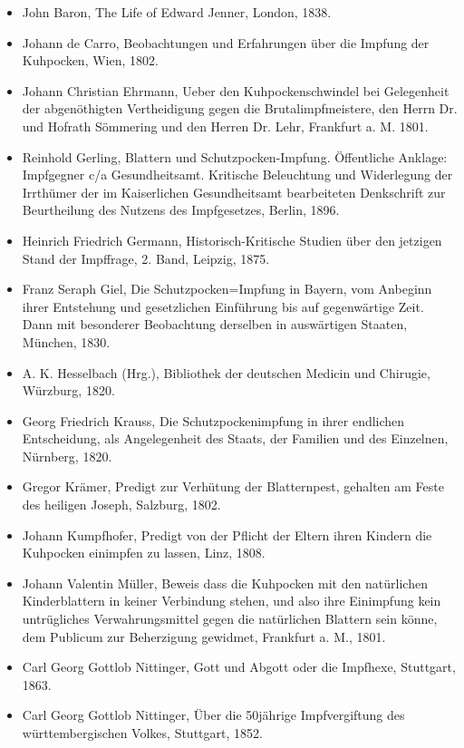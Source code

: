 \documentclass[
    a4paper,
    12pt,
    hyphens,
    chapterprefix=true,
    headheight=33pt,
    footheight=29pt,
    headings=optiontohead,
]{scrartcl}
\begin{document}
{\begin{itemize}
\item{John Baron, The Life of Edward Jenner, London, 1838.}
\item{Johann de Carro, Beobachtungen und Erfahrungen über die Impfung der Kuhpocken, Wien, 1802.}
\item{Johann Christian Ehrmann, Ueber den Kuhpockenschwindel bei Gelegenheit der abgenöthigten Vertheidigung gegen die Brutalimpfmeistere, den Herrn Dr. und Hofrath Sömmering und den Herren Dr. Lehr, Frankfurt a. M. 1801.}
\item{Reinhold Gerling, Blattern und Schutzpocken-Impfung. Öffentliche Anklage: Impfgegner c/a Gesundheitsamt. Kritische  Beleuchtung  und  Widerlegung  der  Irrthümer der  im  Kaiserlichen  Gesundheitsamt  bearbeiteten  Denkschrift  zur Beurtheilung  des  Nutzens  des  Impfgesetzes, Berlin, 1896.}
\item{Heinrich Friedrich Germann, Historisch-Kritische Studien über den jetzigen Stand der Impffrage, 2. Band, Leipzig, 1875.}
\item{Franz Seraph Giel, Die Schutzpocken=Impfung in Bayern, vom Anbeginn ihrer Entstehung und gesetzlichen Einführung  bis auf gegenwärtige Zeit. Dann mit besonderer Beobachtung derselben in auswärtigen Staaten, München, 1830.}
\item{A. K. Hesselbach (Hrg.), Bibliothek der deutschen Medicin und Chirugie, Würzburg, 1820.}
\item{Georg Friedrich Krauss, Die Schutzpockenimpfung in ihrer endlichen Entscheidung, als Angelegenheit des Staats, der Familien und des Einzelnen, Nürnberg, 1820.}
\item{Gregor Krämer, Predigt zur Verhütung der Blatternpest, gehalten am Feste des heiligen Joseph, Salzburg, 1802.}
\item{Johann Kumpfhofer, Predigt von der Pflicht der Eltern ihren Kindern die Kuhpocken einimpfen zu lassen, Linz, 1808.}
\item{Johann Valentin Müller, Beweis dass die Kuhpocken mit den natürlichen Kinderblattern in keiner Verbindung stehen, und also ihre Einimpfung kein untrügliches Verwahrungsmittel gegen die natürlichen Blattern sein könne, dem Publicum zur Beherzigung gewidmet, Frankfurt a. M., 1801.}
\item{Carl Georg Gottlob Nittinger, Gott und Abgott oder die Impfhexe, Stuttgart, 1863.}
\item{Carl Georg Gottlob Nittinger, Über die 50jährige Impfvergiftung des württembergischen Volkes, Stuttgart, 1852.}

\end{itemize}}
\end{document}
